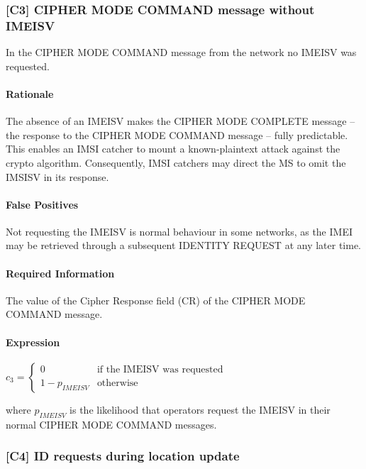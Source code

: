 \documentclass[a4paper,11pt,notitlepage,bigheadings,oneside]{scrartcl}
\begin{document}
\subsubsection{[C3] CIPHER MODE COMMAND message without IMEISV}

In the CIPHER MODE COMMAND message from the network no IMEISV was requested.

\paragraph{Rationale}

The absence of an IMEISV makes the CIPHER MODE COMPLETE message -- the response
to the CIPHER MODE COMMAND message -- fully predictable. This enables an IMSI
catcher to mount a known-plaintext attack against the crypto algorithm.
Consequently, IMSI catchers may direct the MS to omit the IMSISV in its
response.

\paragraph{False Positives}

Not requesting the IMEISV is normal behaviour in some networks, as the IMEI may
be retrieved through a subsequent IDENTITY REQUEST at any later time.

\paragraph{Required Information}

The value of the Cipher Response field (CR) of the CIPHER MODE COMMAND message.

\paragraph{Expression}

$c_3 =
\begin{cases}
	0 		& \text{if the IMEISV was requested} \\
	1 - p_{IMEISV}	& \text{otherwise}
\end{cases}$

where $p_{IMEISV}$ is the likelihood that operators request the IMEISV in their
normal CIPHER MODE COMMAND messages.


\subsubsection{[C4] ID requests during location update}
\end{document}
